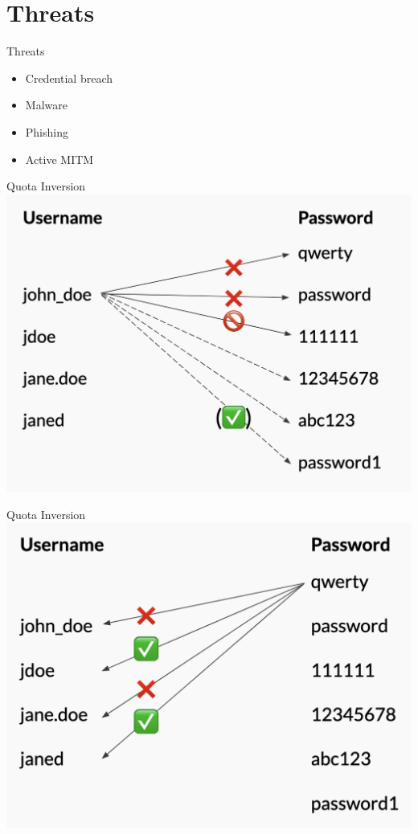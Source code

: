 \documentclass[nobackground,dvipsnames,table,aspectratio=169]{beamer}
\begin{document}
\section{Threats}

\begin{frame}{Threats}
    \Large
    \begin{itemize}
        \item Credential breach
        \item Malware
        \item Phishing
        \item Active MITM
    \end{itemize}
\end{frame}

\begin{frame}{Quota Inversion}
    \includegraphics[width=\textwidth]{quota-inversion-1}
\end{frame}

\begin{frame}{Quota Inversion}
    \includegraphics[width=\textwidth]{quota-inversion-2}
\end{frame}
\end{document}
